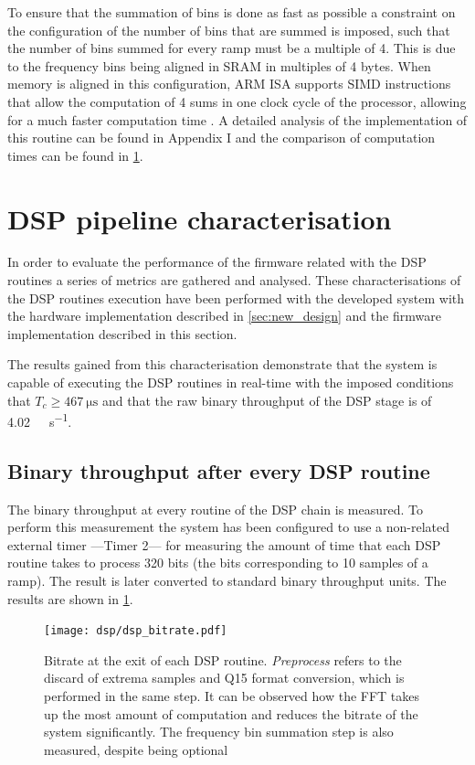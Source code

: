 To ensure that the summation of bins is done as fast as possible a constraint on the configuration of the number of bins that are summed is imposed, such that the number of bins summed for every ramp must be a multiple of 4. This is due to the frequency bins being aligned in SRAM in multiples of 4 bytes. When memory is aligned in this configuration, ARM ISA supports SIMD instructions that allow the computation of 4 sums in one clock cycle of the processor, allowing for a much faster computation time \cite{ARMM4}. A detailed analysis of the implementation of this routine can be found in Appendix I and the comparison of computation times can be found in \cref{sec:dsp_test}.

\section{DSP pipeline characterisation} \label{sec:dsp_test}

In order to evaluate the performance of the firmware related with the DSP routines a series of metrics are gathered and analysed. These characterisations of the DSP routines execution have been performed with the developed system with the hardware implementation described in \cref{sec:new_design} and the firmware implementation described in this section.

The results gained from this characterisation demonstrate that the system is capable of executing the DSP routines in real-time with the imposed conditions that $T_c \ge \SI{467}{\micro\second}$ and that the raw binary throughput of the DSP stage is of \SI{4.02}{\mega\bit\per\second}.

\subsection{Binary throughput after every DSP routine}

The binary throughput at every routine of the DSP chain is measured. To perform this measurement the system has been configured to use a non-related external timer ---Timer 2--- for measuring the amount of time that each DSP routine takes to process 320 bits (the bits corresponding to 10 samples of a ramp). The result is later converted to standard binary throughput units. The results are shown in \cref{fig:firmware_dsp_bitrate}.

\begin{figure}[ht]
	\centering
	\texttt{[image: dsp/dsp\_bitrate.pdf]}
	\caption{Bitrate at the exit of each DSP routine. \textit{Preprocess} refers to the discard of extrema samples and Q15 format conversion, which is performed in the same step. It can be observed how the FFT takes up the most amount of computation and reduces the bitrate of the system significantly. The frequency bin summation step is also measured, despite being optional}
	\label{fig:firmware_dsp_bitrate}
\end{figure}

